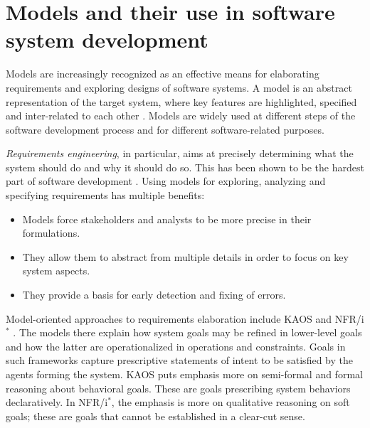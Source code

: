 \section{Models and their use in software system development\label{section:intro-models}}

Models are increasingly recognized as an effective means for elaborating requirements and exploring designs of software systems. A model is an abstract representation of the target system, where key features are highlighted, specified and inter-related to each other \cite{VanLamsweerde:2009}. Models are widely used at different steps of the software development process and for different software-related purposes.


\emph{Requirements engineering}, in particular, aims at precisely determining what the system should do and why it should do so. This has been shown to be the hardest part of software development \cite{Brooks:1987}. Using models for exploring, analyzing and specifying requirements has multiple benefits:
\begin{itemize}
\item Models force stakeholders and analysts to be more precise in their formulations.
\item They allow them to abstract from multiple details in order to focus on key system aspects.
\item They provide a basis for early detection and fixing of errors.
\end{itemize}
Model-oriented approaches to requirements elaboration include KAOS \cite{VanLamsweerde:2009} and NFR/i$^*$ \cite{Mylopoulos:1992, Yu:1993}. The models there explain how system goals may be refined in lower-level goals and how the latter are operationalized in operations and constraints. Goals in such frameworks capture prescriptive statements of intent to be satisfied by the agents forming the system. KAOS puts emphasis more on semi-formal and formal reasoning about behavioral goals. These are goals prescribing system behaviors declaratively. In NFR/i$^*$, the emphasis is more on qualitative reasoning on soft goals; these are goals that cannot be established in a clear-cut sense.


